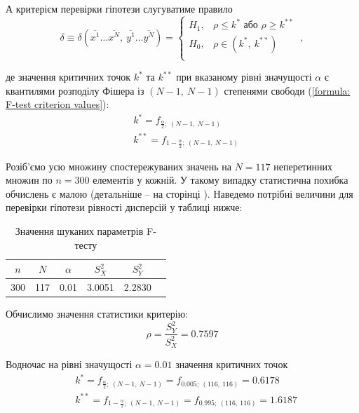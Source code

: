 А критерієм перевірки гіпотези слугуватиме правило
\begin{equation*}
    \delta\equiv\delta(\overline{ x^1}\ldots \overline{x^N},\ \overline{y^1}\ldots \overline{y^N})=
    \begin{cases}
        H_1, & \rho\leqslant k^* \text{ або } \rho\geqslant k^{**} \\
        H_0, & \rho\in (k^*,\ k^{**}) \\
    \end{cases}\ ,
\end{equation*}

де значення критичних точок $k^*$ та $k^{**}$ при вказаному рівні значущості $\alpha$ є квантилями розподілу 
Фішера із $(N-1,\ N-1)$ степенями свободи (\ref{formula: F-test criterion values}):
\begin{align*}
    &k^* = f_{\frac{\alpha}{2};\ (N-1,\ N-1)} \\
    &k^{**} = f_{1-\frac{\alpha}{2};\ (N-1,\ N-1)}
\end{align*}

Розіб'ємо усю множину спостережуваних значень на $N=117$ неперетинних множин по $n=300$ елементів у кожній. 
У такому випадку статистична похибка обчислень є малою (детальніше -- на сторінці \pageref{page: ENG percentage point}). 
Наведемо потрібні величини для перевірки гіпотези рівності дисперсій у таблиці нижче:

\vspace{0.8cm}
\begin{table}[H]
    \begin{center}
        \begin{tabular}{||c|c|c|c|c|c||}
            \hline
            $n$ & $N$ & $\alpha$ & $S_X^2$ & $S_Y^2$ \\
            \hline \hline
            300 & 117 & 0.01 & 3.0051 & 2.2830 \\
            \hline
        \end{tabular}
        \caption{Значення шуканих параметрів F-тесту}
        \label{table: ENG F-test}
    \end{center}
\end{table}

Обчислимо значення статистики критерію:
\begin{equation*}
    \rho = \frac{S_Y^2}{S_X^2} = 0.7597
\end{equation*}

Водночас на рівні значущості $\alpha=0.01$ значення критичних точок
\begin{align*} 
   &k^* = f_{\frac{\alpha}{2};\ (N-1,\ N-1)} = f_{0.005;\ (116,\ 116)} = 0.6178 \\
   &k^{**} = f_{1-\frac{\alpha}{2};\ (N-1,\ N-1)} = f_{0.995;\ (116,\ 116)} = 1.6187
\end{align*}

